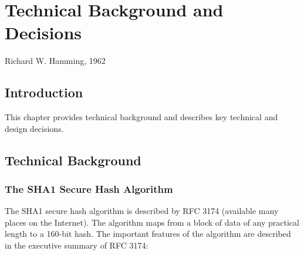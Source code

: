 
\chapter{Technical Background and Decisions}

\label{ctbg0}

                  {Richard W. Hamming, 1962}

\section{Introduction}
\label{ctbg0:sint0}

This chapter provides technical background and describes key 
\emph{\productbasename{}}
technical
and design decisions.


\section{Technical Background}
\label{ctbg0:stbg0}


\subsection{The SHA1 Secure Hash Algorithm}
\label{ctbg0:stbg0:ssha0}

The SHA1 secure hash algorithm is described by 
RFC 3174
(available many places on the Internet).  The algorithm maps from
a block of data of any practical length to a 160-bit hash.  The important features of
the algorithm are described in the executive summary of RFC 3174:

